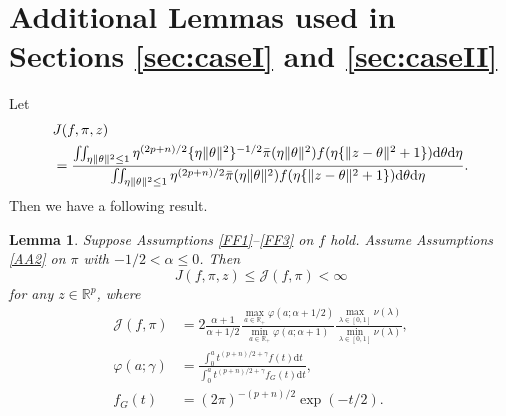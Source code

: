 \documentclass[preprint,11pt]{imsart}
\numberwithin{equation}{section}
\theoremstyle{plain}
\newtheorem{lemma}{Lemma}[section]
\theoremstyle{definition}
\theoremstyle{remark}
\newcommand{\rd}{\mathrm{d}}
\begin{document}
  \section{Additional Lemmas used in Sections \ref{sec:caseI} and \ref{sec:caseII}}
\label{sec:finallemmas}
  Let
   \begin{align}
    &J(f,\pi,z)\label{eq:Mfpi}\\
& =   \frac{\iint_{\eta\|\theta\|^2\leq 1} 
  \eta^{(2p+n)/2} \{\eta\|\theta\|^2\}^{-1/2}\bar{\pi}(\eta\|\theta\|^2) f(\eta\{\|z-\theta\|^2+1\}) 
 \rd \theta   \rd \eta}{\iint_{\eta\|\theta\|^2\leq 1}  
  \eta^{(2p+n)/2} \bar{\pi}(\eta\|\theta\|^2) f(\eta\{\|z-\theta\|^2+1\}) 
  \rd \theta   \rd \eta}.  \notag
   \end{align}
Then we have a following result.
  \begin{lemma}\label{lem:f_around_origin.0}
   Suppose Assumptions \ref{FF1}--\ref{FF3} on $f$ hold.
   Assume Assumptions \ref{AA2} on $\pi$ with $-1/2<\alpha\leq 0$. Then
\begin{equation}\label{eq:lem:f_around_origin.0}
J(f,\pi,z) \leq \mathcal{J}(f,\pi)<\infty
\end{equation} 
for any $z\in\mathbb{R}^p$, where
\begin{equation}\label{eq:mathcalMfpi}
 \begin{split}
  \mathcal{J}(f,\pi)&=2\frac{\alpha+1}{\alpha+1/2}
\frac{\max_{a\in\mathbb{R}_+}\varphi(a;\alpha+1/2)}
  {\min_{a\in\mathbb{R}_+}\varphi(a;\alpha+1)}
  \frac{\max_{\lambda\in[0,1]}\nu(\lambda)}{\min_{\lambda\in[0,1]}\nu(\lambda)}, \\
  \varphi(a;\gamma)&=\frac{\int_0^a  t^{(p+n)/2+\gamma} f(t)  \rd t }{\int_0^a  t^{(p+n)/2+\gamma} f_G(t)  \rd t }, \\
  f_G(t)&=(2\pi)^{-(p+n)/2}\exp(-t/2).
 \end{split}
\end{equation} 
  \end{lemma}
\end{document}
